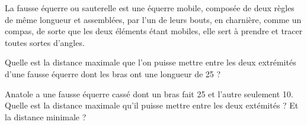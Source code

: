 
\begin{exercice}\label{exosmath-0768}

    La fausse équerre ou sauterelle est une équerre mobile, composée de deux règles de même longueur et assemblées, par l'un de leurs bouts, en charnière, comme un compas, de sorte que les deux éléments étant mobiles, elle sert à prendre et tracer toutes sortes d'angles.

    Quelle est la distance maximale que l'on puisse mettre entre les deux extrémités d'une fausse équerre dont les bras ont une longueur de \unit{25}{\centi\meter} ?

    Anatole a une fausse équerre cassé dont un bras fait \unit{25}{\centi\meter} et l'autre seulement \unit{10}{\centi\meter}. Quelle est la distance maximale qu'il puisse mettre entre les deux extémités ? Et la distance minimale ?

\end{exercice}
